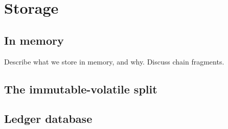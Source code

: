 \chapter{Storage}
\label{storage}

\section{In memory}
\label{in-memory}

Describe what we store in memory, and why. Discuss chain fragments.

\section{The immutable-volatile split}
\label{immutable-volatile-split}

\section{Ledger database}
\label{storage:ledger}
